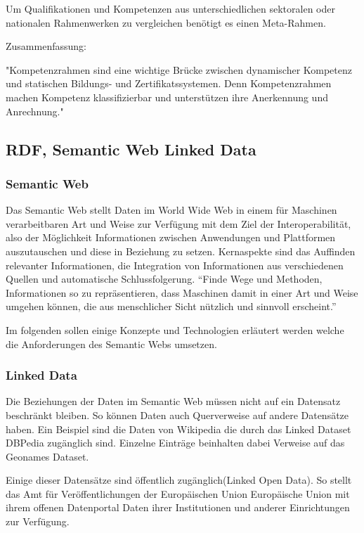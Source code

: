 Um Qualifikationen und Kompetenzen aus unterschiedlichen sektoralen oder nationalen Rahmenwerken zu vergleichen benötigt es einen Meta-Rahmen. 

Zusammenfassung:

"Kompetenzrahmen sind eine wichtige Brücke zwischen dynamischer Kompetenz und statischen Bildungs- und Zertifikatssystemen.
Denn Kompetenzrahmen machen Kompetenz klassifizierbar und unterstützen ihre Anerkennung und Anrechnung."


\subsection{RDF, Semantic Web  Linked Data}\label{semantic_web}
\subsubsection{Semantic Web}
Das Semantic Web stellt Daten im World Wide Web in einem für Maschinen verarbeitbaren Art und Weise zur Verfügung mit dem Ziel der Interoperabilität, also der Möglichkeit Informationen zwischen Anwendungen und Plattformen auszutauschen und diese in Beziehung zu setzen. Kernaspekte sind das Auffinden relevanter Informationen, die Integration von Informationen aus verschiedenen Quellen und automatische Schlussfolgerung.
“Finde Wege und Methoden, Informationen so zu repräsentieren, dass Maschinen damit in einer Art und Weise umgehen können, die aus menschlicher Sicht nützlich und sinnvoll erscheint.”\cite[12]{Hitzler2007}
 
Im folgenden sollen einige Konzepte und Technologien erläutert werden welche die Anforderungen des Semantic Webs umsetzen.
 
\subsubsection{Linked Data}

Die Beziehungen der Daten im Semantic Web müssen nicht auf ein Datensatz beschränkt bleiben. So können Daten auch Querverweise auf andere Datensätze haben. Ein Beispiel sind die Daten von Wikipedia die durch das Linked Dataset DBPedia zugänglich sind. Einzelne Einträge beinhalten dabei Verweise auf das Geonames Dataset.

Einige dieser Datensätze sind öffentlich zugänglich(Linked Open Data). So stellt das Amt für Veröffentlichungen der Europäischen Union Europäische Union mit ihrem offenen Datenportal Daten ihrer Institutionen und anderer Einrichtungen zur Verfügung. 
 
